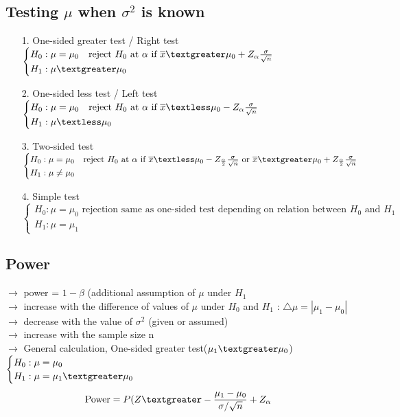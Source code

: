 \documentclass{article}
\begin{document}
\subsection{Testing $\mu$ when $\sigma^2$ is known}
\begin{itemize}
    \item [1.] One-sided greater test / Right test\\
    $\begin{cases}
        H_0:\mu =\mu_0 \quad \text{reject }H_0\text{ at }\alpha \text{ if } \overline{x}\textgreater \mu_0 + Z_{\alpha}\frac{\sigma}{\sqrt{n}}\\
        H_1:\mu \textgreater \mu_0
    \end{cases}$
    \item[2.] One-sided less test / Left test\\
    $\begin{cases}
        H_0:\mu =\mu_0 \quad \text{reject }H_0\text{ at }\alpha \text{ if } \overline{x}\textless \mu_0 - Z_{\alpha}\frac{\sigma}{\sqrt{n}}\\
        H_1:\mu \textless \mu_0
    \end{cases}$
    \item[3.] Two-sided test\\
    $\begin{cases}
        H_0:\mu =\mu_0 \quad \text{reject }H_0\text{ at }\alpha \text{ if } \overline{x}\textless \mu_0 - Z_{\frac{\alpha}{2}}\frac{\sigma}{\sqrt{n}} \text{ or }\overline{x}\textgreater \mu_0 + Z_{\frac{\alpha}{2}}\frac{\sigma}{\sqrt{n}}\\
        H_1:\mu \neq \mu_0
    \end{cases}$
    \item[4.] Simple test\\
    $\begin{cases}
        H_0: \mu=\mu_0 \text{ rejection same as one-sided test depending on relation between }H_0 \text{ and }H_1\\
        H_1:\mu =\mu_1
    \end{cases}$
\end{itemize}
\subsection{Power}
$\rightarrow$ power = $1-\beta$ (additional assumption of $\mu$ under $H_1$\\
$\rightarrow$ increase with the difference of values of $\mu$ under $H_0$ and $H_1$ : $\triangle \mu = |\mu_1 - \mu_0|$\\
$\rightarrow$ decrease with the value of $\sigma^2$ (given or assumed)\\
$\rightarrow$ increase with the sample size n\\
$\rightarrow$ General calculation, One-sided greater test($\mu_1 \textgreater \mu_0$)\\
$\begin{cases}
    H_0: \mu = \mu_0\\
    H_1: \mu = \mu_1 \textgreater \mu_0
\end{cases}$
\[\text{Power}=P(Z \textgreater -\frac{\mu_1-\mu_0}{\sigma /\sqrt{n}}+Z_{\alpha}\]
\end{document}
